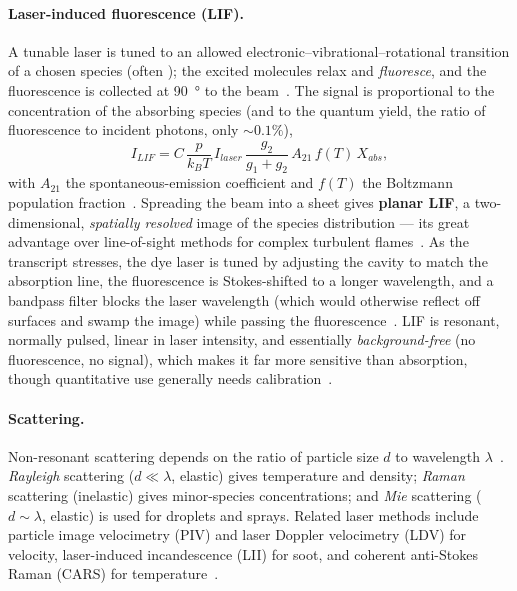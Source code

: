 \paragraph{Laser-induced fluorescence (LIF).} A tunable laser is tuned to an allowed electronic--vibrational--rotational transition of a chosen species (often ); the excited molecules relax and \emph{fluoresce}, and the fluorescence is collected at \SI{90}{\degree} to the beam~\cite{lecture7,crosley1983}. The signal is proportional to the concentration of the absorbing species (and to the quantum yield, the ratio of fluorescence to incident photons, only $\sim0.1\%$),
\begin{equation}
I_{LIF}=C\,\frac{p}{k_B T}\,I_{laser}\,\frac{g_2}{g_1+g_2}\,A_{21}\,f(T)\,X_{abs},
\label{eq:lif}
\end{equation}
with $A_{21}$ the spontaneous-emission coefficient and $f(T)$ the Boltzmann population fraction~\cite{lecture7}. Spreading the beam into a sheet gives \textbf{planar LIF}, a two-dimensional, \emph{spatially resolved} image of the species distribution --- its great advantage over line-of-sight methods for complex turbulent flames~\cite{lecture7,transcript_l7}. As the transcript stresses, the dye laser is tuned by adjusting the cavity to match the  absorption line, the fluorescence is Stokes-shifted to a longer wavelength, and a bandpass filter blocks the laser wavelength (which would otherwise reflect off surfaces and swamp the image) while passing the fluorescence~\cite{transcript_l7}. LIF is resonant, normally pulsed, linear in laser intensity, and essentially \emph{background-free} (no fluorescence, no signal), which makes it far more sensitive than absorption, though quantitative use generally needs calibration~\cite{lecture7}.

\paragraph{Scattering.} Non-resonant scattering depends on the ratio of particle size $d$ to wavelength $\lambda$~\cite{lecture7}. \emph{Rayleigh} scattering ($d\ll\lambda$, elastic) gives temperature and density; \emph{Raman} scattering (inelastic) gives minor-species concentrations; and \emph{Mie} scattering ($d\sim\lambda$, elastic) is used for droplets and sprays. Related laser methods include particle image velocimetry (PIV) and laser Doppler velocimetry (LDV) for velocity, laser-induced incandescence (LII) for soot, and coherent anti-Stokes Raman (CARS) for temperature~\cite{lecture6,lecture7}.

